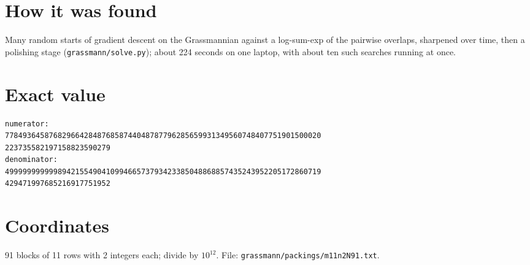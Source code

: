 \documentclass[11pt,a4paper]{article}
\begin{document}
\section{How it was found}
Many random starts of gradient descent on the Grassmannian against a log-sum-exp of the pairwise overlaps, sharpened over time, then a polishing stage (\texttt{grassmann/solve.py}); about 224 seconds on one laptop, with about ten such searches running at once.


\appendix
\section{Exact value}
{\small
\begin{verbatim}
numerator:
778493645876829664284876858744048787796285659931349560748407751901500020
223735582197158823590279
denominator:
499999999999894215549041099466573793423385048868857435243952205172860719
429471997685216917751952
\end{verbatim}}

\section{Coordinates}
91 blocks of 11 rows with 2 integers each; divide by $10^{12}$. File: \texttt{grassmann/packings/m11n2N91.txt}.
{\tiny
\begin{multicols}{4}
\end{multicols}}
\end{document}
